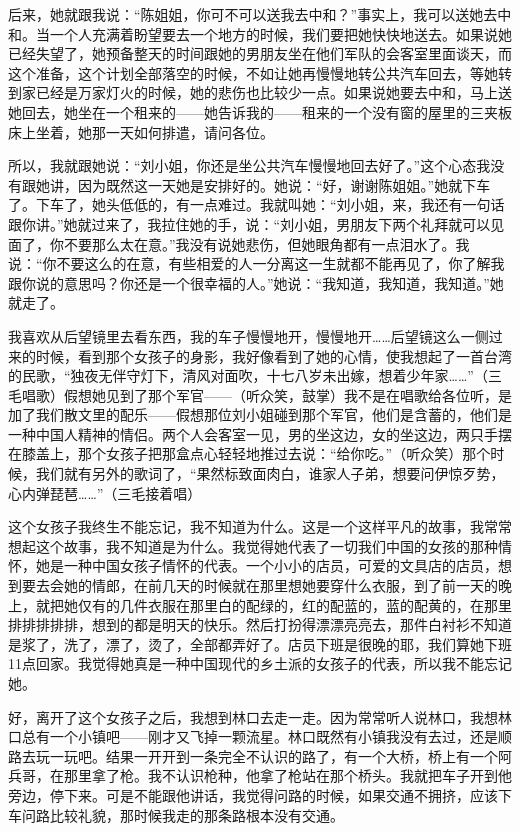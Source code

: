 \par 后来，她就跟我说：“陈姐姐，你可不可以送我去中和？”事实上，我可以送她去中和。当一个人充满着盼望要去一个地方的时候，我们要把她快快地送去。如果说她已经失望了，她预备整天的时间跟她的男朋友坐在他们军队的会客室里面谈天，而这个准备，这个计划全部落空的时候，不如让她再慢慢地转公共汽车回去，等她转到家已经是万家灯火的时候，她的悲伤也比较少一点。如果说她要去中和，马上送她回去，她坐在一个租来的——她告诉我的——租来的一个没有窗的屋里的三夹板床上坐着，她那一天如何排遣，请问各位。
\par 所以，我就跟她说：“刘小姐，你还是坐公共汽车慢慢地回去好了。”这个心态我没有跟她讲，因为既然这一天她是安排好的。她说：“好，谢谢陈姐姐。”她就下车了。下车了，她头低低的，有一点难过。我就叫她：“刘小姐，来，我还有一句话跟你讲。”她就过来了，我拉住她的手，说：“刘小姐，男朋友下两个礼拜就可以见面了，你不要那么太在意。”我没有说她悲伤，但她眼角都有一点泪水了。我说：“你不要这么的在意，有些相爱的人一分离这一生就都不能再见了，你了解我跟你说的意思吗？你还是一个很幸福的人。”她说：“我知道，我知道，我知道。”她就走了。
\par 我喜欢从后望镜里去看东西，我的车子慢慢地开，慢慢地开……后望镜这么一侧过来的时候，看到那个女孩子的身影，我好像看到了她的心情，使我想起了一首台湾的民歌，“独夜无伴守灯下，清风对面吹，十七八岁未出嫁，想着少年家……”（三毛唱歌）假想她见到了那个军官——（听众笑，鼓掌）我不是在唱歌给各位听，是加了我们散文里的配乐——假想那位刘小姐碰到那个军官，他们是含蓄的，他们是一种中国人精神的情侣。两个人会客室一见，男的坐这边，女的坐这边，两只手摆在膝盖上，那个女孩子把那盒点心轻轻地推过去说：“给你吃。”（听众笑）那个时候，我们就有另外的歌词了，“果然标致面肉白，谁家人子弟，想要问伊惊歹势，心内弹琵琶……”（三毛接着唱）
\par 这个女孩子我终生不能忘记，我不知道为什么。这是一个这样平凡的故事，我常常想起这个故事，我不知道是为什么。我觉得她代表了一切我们中国的女孩的那种情怀，她是一种中国女孩子情怀的代表。一个小小的店员，可爱的文具店的店员，想到要去会她的情郎，在前几天的时候就在那里想她要穿什么衣服，到了前一天的晚上，就把她仅有的几件衣服在那里白的配绿的，红的配蓝的，蓝的配黄的，在那里排排排排排，想到的都是明天的快乐。然后打扮得漂漂亮亮去，那件白衬衫不知道是浆了，洗了，漂了，烫了，全部都弄好了。店员下班是很晚的耶，我们算她下班11点回家。我觉得她真是一种中国现代的乡土派的女孩子的代表，所以我不能忘记她。
\par 好，离开了这个女孩子之后，我想到林口去走一走。因为常常听人说林口，我想林口总有一个小镇吧——刚才又飞掉一颗流星。林口既然有小镇我没有去过，还是顺路去玩一玩吧。结果一开开到一条完全不认识的路了，有一个大桥，桥上有一个阿兵哥，在那里拿了枪。我不认识枪种，他拿了枪站在那个桥头。我就把车子开到他旁边，停下来。可是不能跟他讲话，我觉得问路的时候，如果交通不拥挤，应该下车问路比较礼貌，那时候我走的那条路根本没有交通。
